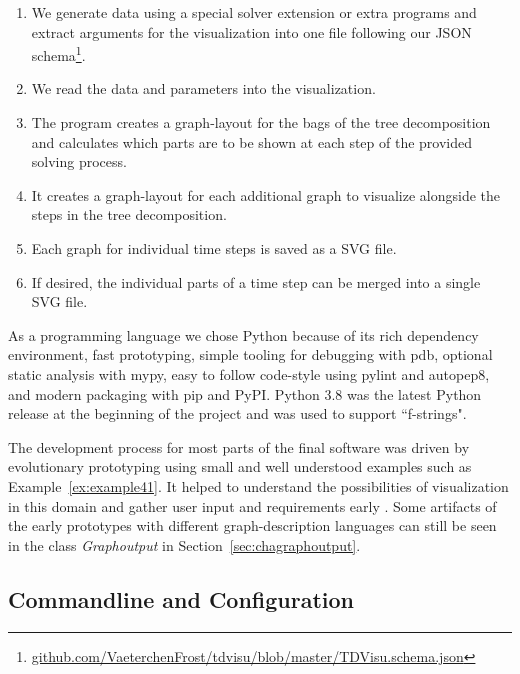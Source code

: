 \documentclass[a4paper, 12pt, bibliography=totoc]{scrartcl}
\begin{document}
\begin{enumerate}
	\item We generate data using a special solver extension or extra programs and extract arguments for the visualization into one file following our JSON schema\footnote{\url{github.com/VaeterchenFrost/tdvisu/blob/master/TDVisu.schema.json}}.
	\item We read the data and parameters into the visualization.
	\item The program creates a graph-layout for the bags of the tree decomposition and calculates which parts are to be shown at each step of the provided solving process.
	\item It creates a graph-layout for each additional graph to visualize alongside the steps in the tree decomposition.
	\item Each graph for individual time steps is saved as a SVG file.
	\item If desired, the individual parts of a time step can be merged into a single SVG file.
\end{enumerate}

As a programming language we chose Python because of its rich dependency environment, fast prototyping, simple tooling for debugging with pdb, optional static analysis with mypy, easy to follow code-style using pylint and autopep8, and modern packaging with pip and PyPI.
Python 3.8 was the latest Python release at the beginning of the project and was used to support ``f-strings". 

The development process for most parts of the final software was driven by evolutionary prototyping using small and well understood examples such as Example~\ref{ex:example41}. It helped to understand the possibilities of visualization in this domain and gather user input and requirements early \cite{rapidPrototypingOvermyer}. Some artifacts of the early prototypes with different graph-description languages can still be seen in the class \textit{Graphoutput} in Section~\ref{sec:chagraphoutput}.

\subsection{Commandline and Configuration}
\end{document}
